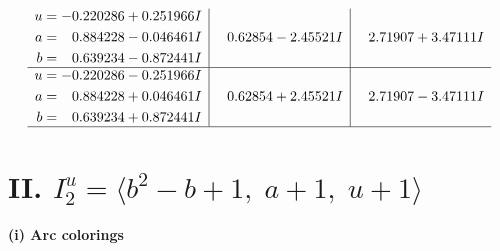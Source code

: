 \documentclass[1p]{elsarticle_modified}
\theoremstyle{definition}
\begin{document}
$$\begin{array}{c|c|c}
\begin{aligned}
u &= -0.220286 + 0.251966 I \\
a &= \phantom{-}0.884228 - 0.046461 I \\
b &= \phantom{-}0.639234 - 0.872441 I\end{aligned}
 & \phantom{-}0.62854 - 2.45521 I & \phantom{-}2.71907 + 3.47111 I \\ \hline\begin{aligned}
u &= -0.220286 - 0.251966 I \\
a &= \phantom{-}0.884228 + 0.046461 I \\
b &= \phantom{-}0.639234 + 0.872441 I\end{aligned}
 & \phantom{-}0.62854 + 2.45521 I & \phantom{-}2.71907 - 3.47111 I\\
 \hline 
 \end{array}$$\newpage\newpage\renewcommand{\arraystretch}{1}
\centering \section*{II. $I^u_{2}= \langle b^2- b+1,\;a+1,\;u+1 \rangle$}
\flushleft \textbf{(i) Arc colorings}\\
\end{document}
